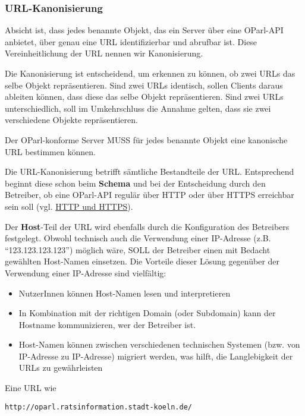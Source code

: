 \documentclass[,a4paper]{article}
\begin{document}
\subsubsection{URL-Kanonisierung}\label{url-kanonisierung}

Absicht ist, dass jedes benannte Objekt, das ein Server über eine
OParl-API anbietet, über genau eine URL identifizierbar und abrufbar
ist. Diese Vereinheitlichung der URL nennen wir Kanonisierung.

Die Kanonisierung ist entscheidend, um erkennen zu können, ob zwei URLs
das selbe Objekt repräsentieren. Sind zwei URLs identisch, sollen
Clients daraus ableiten können, dass diese das selbe Objekt
repräsentieren. Sind zwei URLs unterschiedlich, soll im Umkehrschluss
die Annahme gelten, dass sie zwei verschiedene Objekte repräsentieren.

Der OParl-konforme Server MUSS für jedes benannte Objekt eine kanonische
URL bestimmen können.

Die URL-Kanonisierung betrifft sämtliche Bestandteile der URL.
Entsprechend beginnt diese schon beim \textbf{Schema} und bei der
Entscheidung durch den Betreiber, ob eine OParl-API regulär über HTTP
oder über HTTPS erreichbar sein soll (vgl.
\hyperref[http-und-https]{HTTP und HTTPS}).

Der \textbf{Host}-Teil der URL wird ebenfalls durch die Konfiguration
des Betreibers festgelegt. Obwohl technisch auch die Verwendung einer
IP-Adresse (z.B. ``123.123.123.123'') möglich wäre, SOLL der Betreiber
einen mit Bedacht gewählten Host-Namen einsetzen. Die Vorteile dieser
Lösung gegenüber der Verwendung einer IP-Adresse sind vielfältig:

\begin{itemize}
\itemsep1pt\parskip0pt
\item
  NutzerInnen können Host-Namen lesen und interpretieren
\item
  In Kombination mit der richtigen Domain (oder Subdomain) kann der
  Hostname kommunizieren, wer der Betreiber ist.
\item
  Host-Namen können zwischen verschiedenen technischen Systemen (bzw.
  von IP-Adresse zu IP-Adresse) migriert werden, was hilft, die
  Langlebigkeit der URLs zu gewährleisten
\end{itemize}

Eine URL wie

\begin{verbatim}
http://oparl.ratsinformation.stadt-koeln.de/
\end{verbatim}
\end{document}
